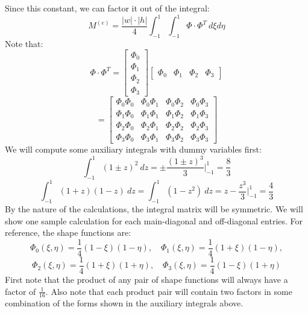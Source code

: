 \documentclass[12pt]{article}
\begin{document}
Since this constant, we can factor it out of the integral:
\[M^{(e)} = \frac{|w| \cdot |h|}{4} \int_{-1}^{1} \int_{-1}^{1} \Phi \cdot \Phi^T \ d\xi d\eta\]
Note that:
\[\Phi \cdot \Phi^T = \begin{bmatrix} 
    \Phi_0 \\ \Phi_1 \\ \Phi_2 \\ \Phi_3
\end{bmatrix}
\begin{bmatrix}
    \Phi_0 & \Phi_1 & \Phi_2 & \Phi_3
\end{bmatrix}\]
\[= \begin{bmatrix}
\Phi_0 \Phi_0 & \Phi_0 \Phi_1 & \Phi_0 \Phi_2 & \Phi_0 \Phi_3 \\
\Phi_1 \Phi_0 & \Phi_1 \Phi_1 & \Phi_1 \Phi_2 & \Phi_1 \Phi_3 \\
\Phi_2 \Phi_0 & \Phi_2 \Phi_1 & \Phi_2 \Phi_2 & \Phi_2 \Phi_3 \\
\Phi_3 \Phi_0 & \Phi_3 \Phi_1 & \Phi_3 \Phi_2 & \Phi_3 \Phi_3
\end{bmatrix}\]
We will compute some auxiliary integrals with dummy variables first:
\[\int_{-1}^{1} (1\pm z)^2 \ dz = \pm \frac{(1\pm z)^3}{3} \Big|_{-1}^{1} = \frac{8}{3}\]
\[\int_{-1}^1 (1+z)(1-z) \ dz = \int_{-1}^1 (1 - z^2) \ dz = z - \frac{z^3}{3} \Big|_{-1}^{1} = \frac{4}{3}\]
By the nature of the calculations, the integral matrix will be symmetric. We will show one sample calculation for each main-diagonal and off-diagonal entries. 
For reference, the shape functions are:
\[\Phi_0(\xi,\eta) = \frac{1}{4}(1-\xi)(1-\eta), \quad \Phi_1(\xi,\eta) = \frac{1}{4}(1+\xi)(1-\eta),\]
\[\Phi_2(\xi,\eta) = \frac{1}{4}(1+\xi)(1+\eta), \quad \Phi_3(\xi,\eta) = \frac{1}{4}(1-\xi)(1+\eta)\]
First note that the product of any pair of shape functions will always have a factor of $\frac{1}{16}$. Also note that each product pair will contain two factors in some combination of the forms shown in the auxiliary integrals above.
\end{document}
